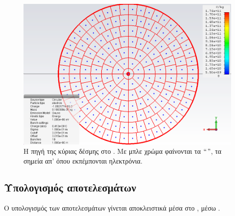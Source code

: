 \begin{figure}[tbh]
\includegraphics[width=\textwidth]{figures/CST-main-beam-source}
\centering
\caption[Η πηγή της κύριας δέσμης στο ]
{Η πηγή της κύριας δέσμης στο . 
Με μπλε χρώμα φαίνονται τα $``$$"$, τα σημεία απ' όπου εκπέμπονται ηλεκτρόνια.}
\label{fig:CST-mainBeamSource}
\end{figure}


\subsection{Υπολογισμός αποτελεσμάτων}

Ο υπολογισμός των αποτελεσμάτων γίνεται αποκλειστικά μέσα στο , μέσω .

